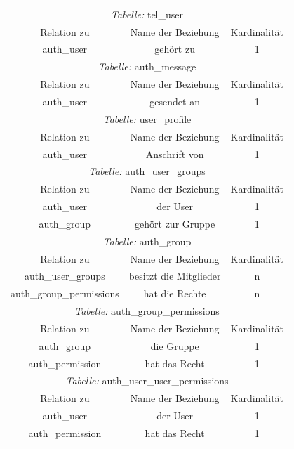 \begin{longtable}{@{}ccc@{}}
  \toprule
  \multicolumn{3}{c}{\emph{Tabelle:} tel\_user} \\
  Relation zu & Name der Beziehung & Kardinalität \\
  \cmidrule(lr){1-1}\cmidrule(lr){2-2}\cmidrule(lr){3-3}
  auth\_user & gehört zu & 1 \\

  \toprule
  \multicolumn{3}{c}{\emph{Tabelle:} auth\_message} \\
  Relation zu & Name der Beziehung & Kardinalität \\
  \cmidrule(lr){1-1}\cmidrule(lr){2-2}\cmidrule(lr){3-3}
  auth\_user & gesendet an & 1 \\

  \toprule
  \multicolumn{3}{c}{\emph{Tabelle:} user\_profile} \\
  Relation zu & Name der Beziehung & Kardinalität \\
  \cmidrule(lr){1-1}\cmidrule(lr){2-2}\cmidrule(lr){3-3}
  auth\_user & Anschrift von & 1 \\

  \toprule
  \multicolumn{3}{c}{\emph{Tabelle:} auth\_user\_groups} \\
  Relation zu & Name der Beziehung & Kardinalität \\
  \cmidrule(lr){1-1}\cmidrule(lr){2-2}\cmidrule(lr){3-3}
  auth\_user & der User & 1 \\
  auth\_group & gehört zur Gruppe & 1 \\

  \toprule
  \multicolumn{3}{c}{\emph{Tabelle:} auth\_group} \\
  Relation zu & Name der Beziehung & Kardinalität \\
  \cmidrule(lr){1-1}\cmidrule(lr){2-2}\cmidrule(lr){3-3}
  auth\_user\_groups & besitzt die Mitglieder & n \\
  auth\_group\_permissions & hat die Rechte & n \\

  \toprule
  \multicolumn{3}{c}{\emph{Tabelle:} auth\_group\_permissions} \\
  Relation zu & Name der Beziehung & Kardinalität \\
  \cmidrule(lr){1-1}\cmidrule(lr){2-2}\cmidrule(lr){3-3}
  auth\_group & die Gruppe & 1 \\
  auth\_permission & hat das Recht & 1 \\

  \toprule
  \multicolumn{3}{c}{\emph{Tabelle:} auth\_user\_user\_permissions} \\
  Relation zu & Name der Beziehung & Kardinalität \\
  \cmidrule(lr){1-1}\cmidrule(lr){2-2}\cmidrule(lr){3-3}
  auth\_user & der User & 1 \\
  auth\_permission & hat das Recht & 1 \\


\end{longtable}
